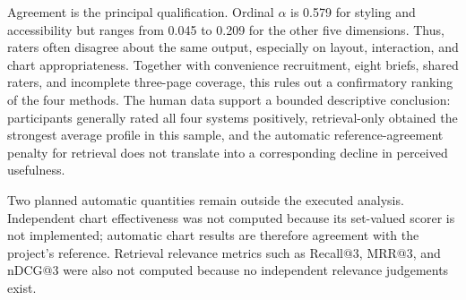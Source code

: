 Agreement is the principal qualification. Ordinal $\alpha$ is 0.579 for styling and accessibility but ranges from 0.045 to 0.209 for the other five dimensions. Thus, raters often disagree about the same output, especially on layout, interaction, and chart appropriateness. Together with convenience recruitment, eight briefs, shared raters, and incomplete three-page coverage, this rules out a confirmatory ranking of the four methods. The human data support a bounded descriptive conclusion: participants generally rated all four systems positively, retrieval-only obtained the strongest average profile in this sample, and the automatic reference-agreement penalty for retrieval does not translate into a corresponding decline in perceived usefulness.

Two planned automatic quantities remain outside the executed analysis. Independent chart effectiveness was not computed because its set-valued scorer is not implemented; automatic chart results are therefore agreement with the project's reference. Retrieval relevance metrics such as Recall@3, MRR@3, and nDCG@3 were also not computed because no independent relevance judgements exist.
